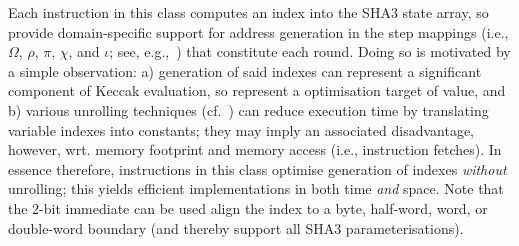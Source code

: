 Each instruction in this class 
computes an index into the SHA3 state array, so provide domain-specific 
support for address generation in the step mappings
(i.e., $\Omega$, $\rho$, $\pi$, $\chi$, and $\iota$; see, e.g.,~\cite[Section 3.2]{SCARV:FIPS:202})
that constitute each round.
Doing so is motivated by a simple observation:
a) generation of said indexes can represent a significant component of
   Keccak evaluation, so represent a optimisation target of value,
   and
b) various unrolling techniques (cf.~\cite{SCARV:BDPAK:12}) can reduce 
   execution time by translating variable indexes into constants; they
   may imply an associated disadvantage, however, wrt. memory footprint
   and memory access (i.e., instruction fetches).
In essence therefore, instructions in this class optimise generation of
indexes {\em without} unrolling; this yields efficient implementations
in both time {\em and} space.
Note that the $2$-bit immediate  can be used align the 
index to a byte, half-word, word, or double-word boundary (and thereby 
support all SHA3 parameterisations).







